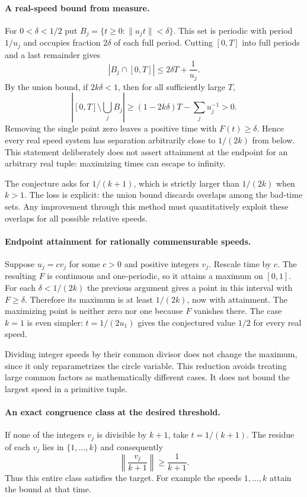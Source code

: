 \documentclass[11pt,a4paper]{article}
\begin{document}
\paragraph{A real-speed bound from measure.}
For $0<\delta<1/2$ put $B_j=\{t\ge0:\|u_jt\|<\delta\}$. This set is periodic with period $1/u_j$ and occupies fraction $2\delta$ of each full period. Cutting $[0,T]$ into full periods and a last remainder gives
\[
|B_j\cap[0,T]|\le 2\delta T+\frac1{u_j}.
\]
By the union bound, if $2k\delta<1$, then for all sufficiently large $T$,
\[
\left|[0,T]\setminus\bigcup_j B_j\right|
\ge(1-2k\delta)T-\sum_j u_j^{-1}>0.
\]
Removing the single point zero leaves a positive time with $F(t)\ge\delta$. Hence every real speed system has separation arbitrarily close to $1/(2k)$ from below. This statement deliberately does not assert attainment at the endpoint for an arbitrary real tuple: maximizing times can escape to infinity.

The conjecture asks for $1/(k+1)$, which is strictly larger than $1/(2k)$ when $k>1$. The loss is explicit: the union bound discards overlaps among the bad-time sets. Any improvement through this method must quantitatively exploit these overlaps for all possible relative speeds.

\paragraph{Endpoint attainment for rationally commensurable speeds.}
Suppose $u_j=cv_j$ for some $c>0$ and positive integers $v_j$. Rescale time by $c$. The resulting $F$ is continuous and one-periodic, so it attains a maximum on $[0,1]$. For each $\delta<1/(2k)$ the previous argument gives a point in this interval with $F\ge\delta$. Therefore its maximum is at least $1/(2k)$, now with attainment. The maximizing point is neither zero nor one because $F$ vanishes there. The case $k=1$ is even simpler: $t=1/(2u_1)$ gives the conjectured value $1/2$ for every real speed.

Dividing integer speeds by their common divisor does not change the maximum, since it only reparametrizes the circle variable. This reduction avoids treating large common factors as mathematically different cases. It does not bound the largest speed in a primitive tuple.

\paragraph{An exact congruence class at the desired threshold.}
If none of the integers $v_j$ is divisible by $k+1$, take $t=1/(k+1)$. The residue of each $v_j$ lies in $\{1,\ldots,k\}$ and consequently
\[
\left\|\frac{v_j}{k+1}\right\|\ge\frac1{k+1}.
\]
Thus this entire class satisfies the target. For example the speeds $1,\ldots,k$ attain the bound at that time.
\end{document}
